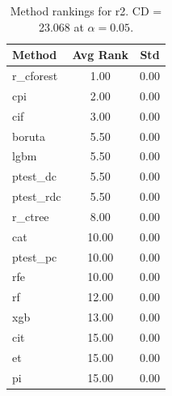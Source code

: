 \begin{table}[h]
\centering
\caption{Method rankings for r2. CD = 23.068 at $\alpha=0.05$.}
\label{tab:ranks_r2}
\begin{tabular}{lcc}
\toprule
Method & Avg Rank & Std \\
\midrule
r_cforest & 1.00 & 0.00 \\
cpi & 2.00 & 0.00 \\
cif & 3.00 & 0.00 \\
boruta & 5.50 & 0.00 \\
lgbm & 5.50 & 0.00 \\
ptest_dc & 5.50 & 0.00 \\
ptest_rdc & 5.50 & 0.00 \\
r_ctree & 8.00 & 0.00 \\
cat & 10.00 & 0.00 \\
ptest_pc & 10.00 & 0.00 \\
rfe & 10.00 & 0.00 \\
rf & 12.00 & 0.00 \\
xgb & 13.00 & 0.00 \\
cit & 15.00 & 0.00 \\
et & 15.00 & 0.00 \\
pi & 15.00 & 0.00 \\
\bottomrule
\end{tabular}
\end{table}